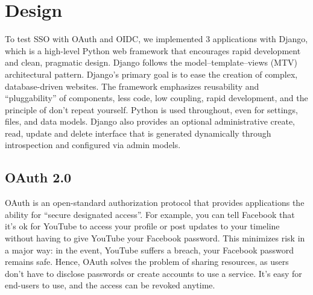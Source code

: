 \section{Design}

To test SSO with OAuth and OIDC, we implemented 3 applications with Django, which is a high-level Python web framework that encourages rapid development and clean, pragmatic design. Django follows the model–template–views (MTV) architectural pattern. Django's primary goal is to ease the creation of complex, database-driven websites. The framework emphasizes reusability and ``pluggability'' of components, less code, low coupling, rapid development, and the principle of don't repeat yourself. Python is used throughout, even for settings, files, and data models. Django also provides an optional administrative create, read, update and delete interface that is generated dynamically through introspection and configured via admin models.



\subsection{OAuth 2.0}

OAuth is an open-standard authorization protocol that provides applications the ability for ``secure designated access''. For example, you can tell Facebook that it’s ok for YouTube to access your profile or post updates to your timeline without having to give YouTube your Facebook password. This minimizes risk in a major way: in the event, YouTube suffers a breach, your Facebook password remains safe. Hence, OAuth solves the problem of sharing resources, as users don't have to disclose passwords or create accounts to use a service. It's easy for end-users to use, and the access can be revoked anytime.

